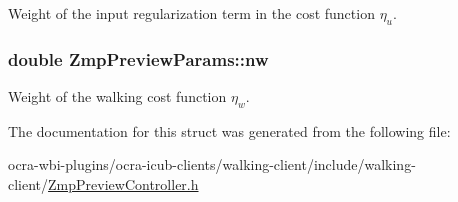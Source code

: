 \-Weight of the input regularization term in the cost function $\eta_u$. \hypertarget{structZmpPreviewParams_ae09ca5b74feda7b0af99c07cd7a36c64}{
\subsubsection[{nw}]{\setlength{\rightskip}{0pt plus 5cm}double {\bf \-Zmp\-Preview\-Params\-::nw}}}\label{structZmpPreviewParams_ae09ca5b74feda7b0af99c07cd7a36c64}
\-Weight of the walking cost function $ \eta_w $. 

\-The documentation for this struct was generated from the following file\-:\begin{DoxyCompactItemize}
\item 
ocra-\/wbi-\/plugins/ocra-\/icub-\/clients/walking-\/client/include/walking-\/client/\hyperlink{ZmpPreviewController_8h}{\-Zmp\-Preview\-Controller.\-h}\end{DoxyCompactItemize}
